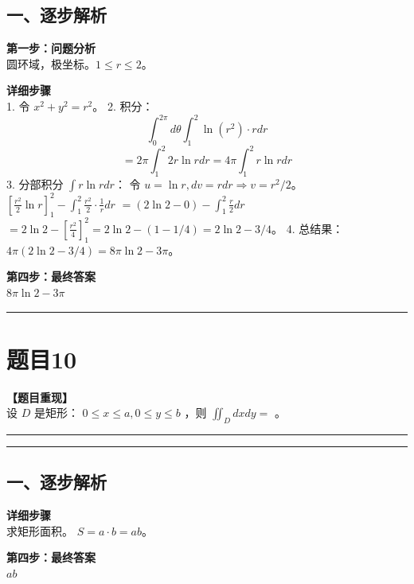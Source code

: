 \documentclass[12pt, a4paper]{ctexart}
\newcommand{\TopSeparator}{
    \par\noindent\rule{\textwidth}{1.5pt}\vspace{0.5em} %
}
\newcommand{\AnalysisSeparator}{
    \par\noindent\rule{\textwidth}{0.5pt}\vspace{0.2em}\hrule\vspace{0.5em} %
}
\newenvironment{RedAnalysis}{
    \par
    \color{red} %
}{
    \par
    \color{black} %
}
\begin{document}
\begin{RedAnalysis}

\subsection*{一、逐步解析}

\textbf{第一步：问题分析} \\
圆环域，极坐标。$1 \le r \le 2$。

\textbf{详细步骤} \\
1. 令 $x^2+y^2 = r^2$。
2. 积分：
   \[ \int_0^{2\pi} d\theta \int_1^2 \ln(r^2) \cdot r dr \]
   \[ = 2\pi \int_1^2 2r \ln r dr = 4\pi \int_1^2 r \ln r dr \]
3. 分部积分 $\int r \ln r dr$：
   令 $u=\ln r, dv=r dr \Rightarrow v=r^2/2$。
   $[\frac{r^2}{2}\ln r]_1^2 - \int_1^2 \frac{r^2}{2} \cdot \frac{1}{r} dr$
   $= (2\ln 2 - 0) - \int_1^2 \frac{r}{2} dr$
   $= 2\ln 2 - [\frac{r^2}{4}]_1^2 = 2\ln 2 - (1 - 1/4) = 2\ln 2 - 3/4$。
4. 总结果：
   $4\pi (2\ln 2 - 3/4) = 8\pi \ln 2 - 3\pi$。

\textbf{第四步：最终答案} \\
$ 8\pi \ln 2 - 3\pi $

\end{RedAnalysis}

\vspace{2em}

\TopSeparator
\section*{题目10}

\textbf{【题目重现】} \\
设 $D$ 是矩形： $ 0 \leq x \leq a, 0 \leq y \leq b $ ，则 $ \iint_{D} dxdy = $ \underline{\hspace{2cm}}。

\AnalysisSeparator

\begin{RedAnalysis}

\subsection*{一、逐步解析}

\textbf{详细步骤} \\
求矩形面积。
$S = a \cdot b = ab$。

\textbf{第四步：最终答案} \\
$ ab $

\end{RedAnalysis}
\end{document}
